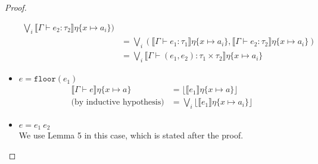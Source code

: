 \begin{proof}
\begin{itemize}
\begin{align*}
 \bigvee_i \llbracket \Gamma \vdash e_2 : \tau_2 \rrbracket\eta\{x \mapsto a_i\}) \\
 &= \bigvee_i ( \llbracket \Gamma \vdash e_1 : \tau_1 \rrbracket\eta\{x \mapsto a_i\},
  \llbracket \Gamma \vdash e_2 : \tau_2 \rrbracket\eta\{x \mapsto a_i\}) \\
  &= \bigvee_i \llbracket \Gamma \vdash (e_1, e_2): \tau_1 \times \tau_2 \rrbracket\eta\{x\mapsto a_i\}
  \end{align*}
  \item $e = \texttt{floor}(e_1)$
  \begin{align*}
   \llbracket \Gamma \vdash e \rrbracket\eta\{x \mapsto a\} &= 
   \lfloor \llbracket e_1 \rrbracket\eta\{x \mapsto a\} \rfloor \\
  \text{(by inductive hypothesis)} &= \bigvee_i \lfloor \llbracket e_1 \rrbracket\eta\{x \mapsto a_i\} \rfloor
   \end{align*}
 \item $ e = e_1 \ e_2$ \\ 
 We use Lemma 5 in this case, which is stated after the proof.
 

\end{itemize}
\end{proof}
